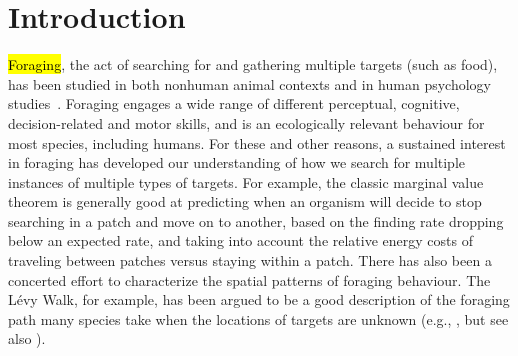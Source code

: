 \documentclass[vision,article,accept,pdftex,moreauthors]{Definitions/mdpi}
\begin{document}



\section{Introduction}

\hl{Foraging}, the act of searching for and gathering multiple targets (such as food), has been studied in both nonhuman animal contexts \cite{dawkins1971} and in human psychology studies~\cite{kristjansson2014}. Foraging engages a wide range of different perceptual, cognitive, decision-related and motor skills, and is an ecologically relevant behaviour for most species, including humans. For these and other reasons, a sustained interest in foraging has developed our understanding of how we search for multiple instances of multiple types of targets. For example, the classic marginal value theorem \cite {charnov1976} is generally good at predicting when an organism will decide to stop searching in a patch and move on to another, based on the finding rate dropping below an expected rate, and taking into account the relative energy costs of traveling between patches versus staying within a patch. There has also been a concerted effort to characterize the spatial patterns of foraging behaviour. The Lévy Walk, for example, has been argued to be a good description of the foraging path many species take when the locations of targets are unknown (e.g., \citep {bartumeus2005}, but see also \citep{benhamou2007}). %
\end{document}
